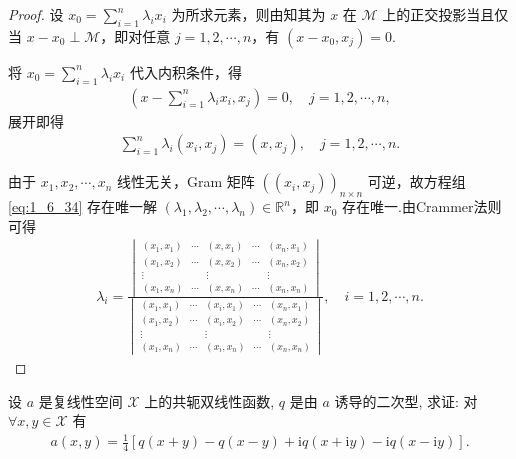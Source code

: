 \documentclass[../../main.tex]{subfiles}%
\begin{document}
\begin{proof}

设 $x_0 = \sum\limits_{i=1}^{n} \lambda_i x_i$ 为所求元素，则由知其为 $x$ 在 $\mathscr{M}$ 上的正交投影当且仅当 $x - x_0 \perp \mathscr{M}$，即对任意 $j = 1, 2, \cdots, n$，有 $(x - x_0, x_j) = 0$.

将 $x_0 = \sum\limits_{i=1}^{n} \lambda_i x_i$ 代入内积条件，得
\begin{align*}
\left( x - \sum\limits_{i=1}^{n} \lambda_i x_i, x_j \right) = 0, \quad j = 1, 2, \cdots, n,
\end{align*}
展开即得
\begin{align}
\sum\limits_{i=1}^{n} \lambda_i (x_i, x_j) = (x, x_j), \quad j = 1, 2, \cdots, n. \label{eq:1_6_34}
\end{align}

由于 $x_1, x_2, \cdots, x_n$ 线性无关，Gram 矩阵 $((x_i, x_j))_{n \times n}$ 可逆，故方程组 \eqref{eq:1_6_34} 存在唯一解 $(\lambda_1, \lambda_2, \cdots, \lambda_n) \in \mathbb{R}^n$，即 $x_0$ 存在唯一.由Crammer法则可得
\begin{align*}
\lambda_i = \frac{
\begin{vmatrix}
(x_1, x_1) & \cdots & (x, x_1) & \cdots & (x_n, x_1) \\
(x_1, x_2) & \cdots & (x, x_2) & \cdots & (x_n, x_2) \\
\vdots & & \vdots & & \vdots \\
(x_1, x_n) & \cdots & (x, x_n) & \cdots & (x_n, x_n)
\end{vmatrix}
}{
\begin{vmatrix}
(x_1, x_1) & \cdots & (x_i, x_1) & \cdots & (x_n, x_1) \\
(x_1, x_2) & \cdots & (x_i, x_2) & \cdots & (x_n, x_2) \\
\vdots & & \vdots & & \vdots \\
(x_1, x_n) & \cdots & (x_i, x_n) & \cdots & (x_n, x_n)
\end{vmatrix}
}, \quad i = 1, 2, \cdots, n.
\end{align*}

\end{proof}


\begin{proposition}[极化恒等式]
设 $a$ 是复线性空间 $\mathscr{X}$ 上的共轭双线性函数, $q$ 是由 $a$ 诱导的二次型, 求证: 对 $\forall x,y\in\mathscr{X}$ 有
\begin{align*}
a(x,y)=\frac{1}{4}\left[q(x+y)-q(x-y)+\mathrm{i}q(x+\mathrm{i}y)-\mathrm{i}q(x-\mathrm{i}y)\right].
\end{align*}
\end{proposition}
\end{document}
